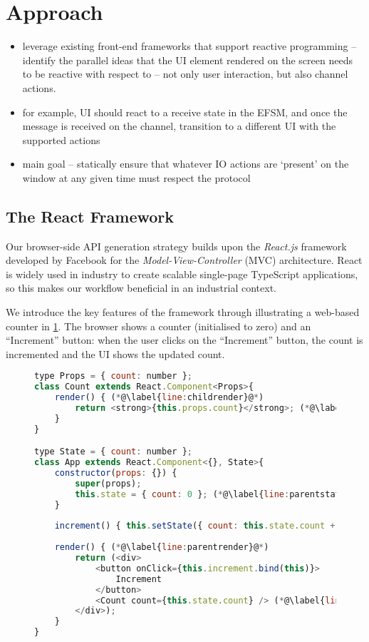 \section{Approach}
\begin{itemize}
\item leverage existing front-end frameworks that support reactive programming -- identify the parallel ideas that the UI element rendered on the screen needs to be reactive with respect to -- not only user interaction, but also channel actions.
\item for example, UI should react to a receive state in the EFSM, and once the message is received on the channel, transition to a different UI with the supported actions
\item main goal -- statically ensure that whatever IO actions are `present' on the window at any given time must respect the protocol
\end{itemize}

\subsection{The React Framework}
Our browser-side API generation strategy builds upon the 
\emph{React.js} framework developed by Facebook \cite{React} for the
\textit{Model-View-Controller} (MVC) architecture.
React is widely used in industry to create scalable single-page
TypeScript applications, so this makes our workflow beneficial in an
industrial context.

We introduce the key features of the framework
through illustrating a web-based counter in \cref{lst:counter}.
The browser shows a counter (initialised to zero) 
and an ``Increment'' button:
when the user clicks on the ``Increment'' button,
the count is incremented and the UI shows the updated count.

\begin{figure}[!h]
\begin{lstlisting}[language=javascript,tabsize=2]
type Props = { count: number };
class Count extends React.Component<Props>{
	render() { (*@\label{line:childrender}@*)
		return <strong>{this.props.count}</strong>; (*@\label{line:childprops}@*)
	}
}

type State = { count: number };
class App extends React.Component<{}, State>{
	constructor(props: {}) {
		super(props);
		this.state = { count: 0 }; (*@\label{line:parentstate}@*)
	}
	
	increment() { this.setState({ count: this.state.count + 1 }); (*@\label{line:parentsetstate}@*)
	
	render() { (*@\label{line:parentrender}@*)
		return (<div>
			<button onClick={this.increment.bind(this)}>
				Increment
			</button>
			<Count count={this.state.count} /> (*@\label{line:childcomponent}@*)
		</div>);	
	}
}
\end{lstlisting}
\label{lst:counter}
\end{figure}

